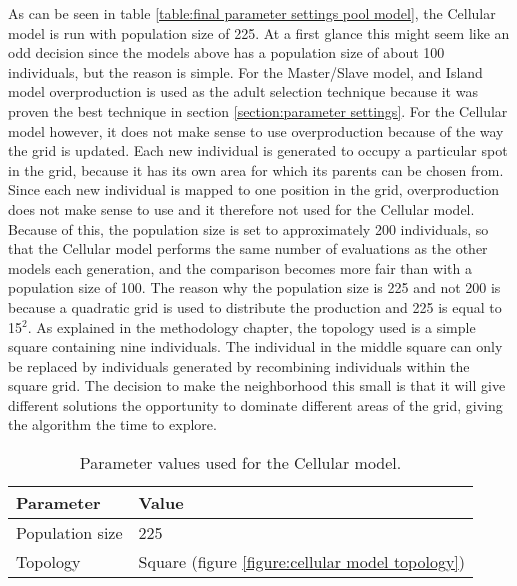\noindent As can be seen in table \ref{table:final parameter settings pool model}, the Cellular model is run with population size of 225. At a first glance this might seem like an odd decision since the models above has a population size of about 100 individuals, but the reason is simple. For the Master/Slave model, and Island model overproduction is used as the adult selection technique because it was proven the best technique in section \ref{section:parameter settings}. For the Cellular model however, it does not make sense to use overproduction because of the way the grid is updated. Each new individual is generated to occupy a particular spot in the grid, because it has its own area for which its parents can be chosen from. Since each new individual is mapped to one position in the grid, overproduction does not make sense to use and it therefore not used for the Cellular model. Because of this, the population size is set to approximately 200 individuals, so that the Cellular model performs the same number of evaluations as the other models each generation, and the comparison becomes more fair than with a population size of 100. The reason why the population size is 225 and not 200 is because a quadratic grid is used to distribute the production and 225 is equal to 15$^{2}$. As explained in the methodology chapter, the topology used is a simple square containing nine individuals. The individual in the middle square can only be replaced by individuals generated by recombining individuals within the square grid. The decision to make the neighborhood this small is that it will give different solutions the opportunity to dominate different areas of the grid, giving the algorithm the time to explore.\\


\begin{table}
\centering
\caption{Parameter values used for the Cellular model.}
\label{table:final parameter settings cellular model}
\begin{tabular}{l|l}
\textbf{Parameter} & \textbf{Value} \\ 
\hline 
Population size & 225 \\
Topology & Square (figure \ref{figure:cellular model topology}) \\  
\end{tabular}
\end{table}


